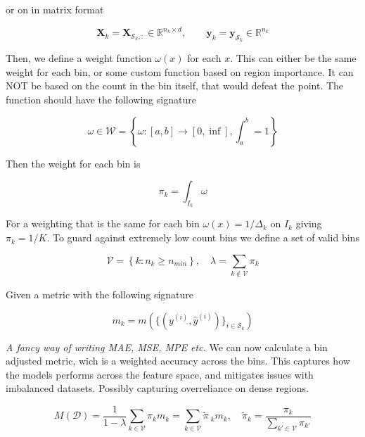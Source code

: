 \documentclass{article} %
\begin{document}
or on in matrix format

\begin{equation}
    \mathbf{X}_k = \mathbf{X}_{\mathcal{S}_k,:} \in \mathbb{R}^{n_k \times d}, \qquad
    \mathbf{y}_k = \mathbf{y}_{\mathcal{S}_k} \in \mathbb{R}^{n_k}
\end{equation}

Then, we define a weight function \(\omega(x)\) for each \(x\). This can either be the same weight for each bin, or some custom function based on region importance. It can NOT be based on the count in the bin itself, that would defeat the point. The function should have the following signature

\begin{equation}
    \omega \in \mathcal{W} = \left\{ \omega : [a,b] \rightarrow [0,\inf], \int_{a}^{b} = 1 \right\}
\end{equation}

Then the weight for each bin is

\begin{equation}
    \pi_k = \int_{I_k}\omega
\end{equation}

For a weighting that is the same for each bin \(\omega(x)=1/\Delta_k \text{ on } I_k\) giving \(\pi_k = 1/K\). To guard against extremely low count bins we define a set of valid bins

\begin{equation}
    \mathcal{V} = \left\{ k:n_k \ge n_{min} \right\},\quad \lambda = \sum_{k \notin \mathcal{V}} \pi_k
\end{equation}

Given a metric with the following signature

\begin{equation}
    m_k = m\left(\{(y^{(i)}, \hat{y}^{(i)})\}_{i \in \mathcal{S}_k}\right)
\end{equation}

\emph{A fancy way of writing MAE, MSE, MPE etc.} We can now calculate a bin adjusted metric, wich is a weighted accuracy across the bins. This captures how the models performs across the feature space, and mitigates issues with imbalanced datasets. Possibly capturing overreliance on dense regions.

\begin{equation}
    M(\mathcal{D}) = \frac{1}{1-\lambda} \sum_{k\in\mathcal{V}}\pi_k m_k = \sum_{k\in\mathcal{V}}\tilde{\pi}~_k m_k,\quad
    \tilde{\pi}_k = \frac{\pi_k}{\sum_{k'\in\mathcal{V}}\pi_{k'}}
\end{equation}
\end{document}
